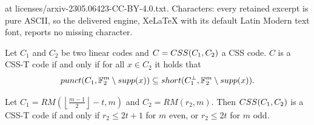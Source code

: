 \documentclass[10pt,a4paper]{amsart}
\newcommand{\CSS}{\textnormal{CSS}}
\newcommand{\F}{{\mathbb{F}}}
\newcommand{\floor}[1]{\left\lfloor#1\right\rfloor}
\newcommand{\punct}{\textnormal{punct}}
\newcommand{\short}{\textnormal{short}}
\newcommand{\supp}{\textnormal{supp}}
\begin{document}
at licenses/arxiv-2305.06423-CC-BY-4.0.txt. Characters: every retained excerpt is pure ASCII, so the delivered engine, XeLaTeX with its default Latin Modern text font, reports no missing character.
\begin{corollary}
Let $C_1$ and $C_2$ be two linear codes and $C=\CSS(C_1,C_2)$ a CSS code. $C$ is a CSS-T code if and only if for all $x\in C_2$ it holds that \[\punct(C_1,\F_2^m\setminus \supp(x))\subseteq \short(C_1^\perp,\F_2^m\setminus \supp(x)).\]
\label{cor:short}
\end{corollary}

\begin{theorem}\label{t:css-t}
Let $C_1=RM(\floor{\frac{m-1}{2}} - t, m)$ and  $C_2=RM(r_2,m)$. Then $\CSS(C_1,C_2)$ is a CSS-T code if and only if $r_2\leq 2t+1$ for $m$ even, or 
$r_2\leq 2t$ for $m$ odd.
\end{theorem}
\end{document}
